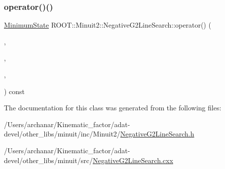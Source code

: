 \mbox{\label{classROOT_1_1Minuit2_1_1NegativeG2LineSearch_ac39ff4c0d14335bd8c8bdcede066ecdf}} 
\subsubsection{\texorpdfstring{operator()()}{operator()()}\hspace{0.1cm}{\footnotesize\ttfamily [3/3]}}
{\footnotesize\ttfamily \mbox{\hyperlink{classROOT_1_1Minuit2_1_1MinimumState}{Minimum\+State}} R\+O\+O\+T\+::\+Minuit2\+::\+Negative\+G2\+Line\+Search\+::operator() (\begin{DoxyParamCaption}\item[{const \mbox{\hyperlink{classROOT_1_1Minuit2_1_1MnFcn}{Mn\+Fcn}} \&}]{,  }\item[{const \mbox{\hyperlink{classROOT_1_1Minuit2_1_1MinimumState}{Minimum\+State}} \&}]{,  }\item[{const \mbox{\hyperlink{classROOT_1_1Minuit2_1_1GradientCalculator}{Gradient\+Calculator}} \&}]{,  }\item[{const \mbox{\hyperlink{classROOT_1_1Minuit2_1_1MnMachinePrecision}{Mn\+Machine\+Precision}} \&}]{ }\end{DoxyParamCaption}) const}



The documentation for this class was generated from the following files\+:\begin{DoxyCompactItemize}
\item 
/\+Users/archanar/\+Kinematic\+\_\+factor/adat-\/devel/other\+\_\+libs/minuit/inc/\+Minuit2/\mbox{\hyperlink{adat-devel_2other__libs_2minuit_2inc_2Minuit2_2NegativeG2LineSearch_8h}{Negative\+G2\+Line\+Search.\+h}}\item 
/\+Users/archanar/\+Kinematic\+\_\+factor/adat-\/devel/other\+\_\+libs/minuit/src/\mbox{\hyperlink{adat-devel_2other__libs_2minuit_2src_2NegativeG2LineSearch_8cxx}{Negative\+G2\+Line\+Search.\+cxx}}\end{DoxyCompactItemize}
